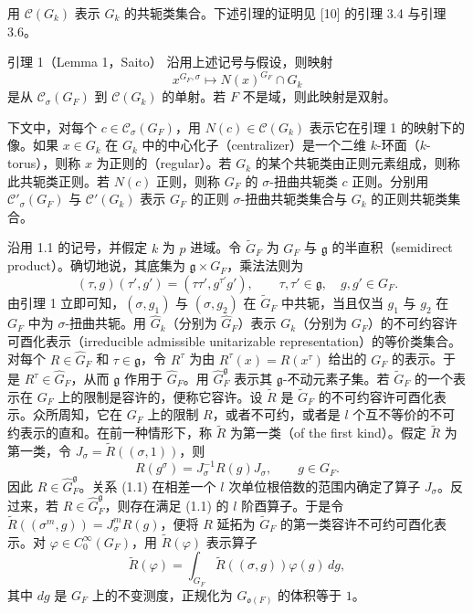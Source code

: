 用 $\mathcal C(G_k)$ 表示 $G_k$ 的共轭类集合。下述引理的证明见 [10] 的引理 3.4 与引理 3.6。

\begin{originaltheorem}{引理 1（Lemma 1，Saito）}
沿用上述记号与假设，则映射
\[
 x^{G_F,\sigma}\longmapsto N(x)^{G_F}\cap G_k
\]
是从 $\mathcal C_\sigma(G_F)$ 到 $\mathcal C(G_k)$ 的单射。若 $F$ 不是域，则此映射是双射。
\end{originaltheorem}

下文中，对每个 $c\in\mathcal C_\sigma(G_F)$，用 $N(c)\in\mathcal C(G_k)$ 表示它在引理 1 的映射下的像。如果 $x\in G_k$ 在 $G_k$ 中的中心化子（centralizer）是一个二维 $k$-环面（$k$-torus），则称 $x$ 为正则的（regular）。若 $G_k$ 的某个共轭类由正则元素组成，则称此共轭类正则。若 $N(c)$ 正则，则称 $G_F$ 的 $\sigma$-扭曲共轭类 $c$ 正则。分别用 $\mathcal C'_\sigma(G_F)$ 与 $\mathcal C'(G_k)$ 表示 $G_F$ 的正则 $\sigma$-扭曲共轭类集合与 $G_k$ 的正则共轭类集合。

沿用 1.1 的记号，并假定 $k$ 为 $p$ 进域。令 $\widetilde G_F$ 为 $G_F$ 与 $\mathfrak g$ 的半直积（semidirect product）。确切地说，其底集为 $\mathfrak g\times G_F$，乘法法则为
\[
 (\tau,g)(\tau',g')=(\tau\tau',g^{\tau'}g'),
 \qquad\tau,\tau'\in\mathfrak g,\quad g,g'\in G_F.
\]
由引理 1 立即可知，$(\sigma,g_1)$ 与 $(\sigma,g_2)$ 在 $\widetilde G_F$ 中共轭，当且仅当 $g_1$ 与 $g_2$ 在 $G_F$ 中为 $\sigma$-扭曲共轭。用 $\widehat G_k$（分别为 $\widehat G_F$）表示 $G_k$（分别为 $G_F$）的不可约容许可酉化表示（irreducible admissible unitarizable representation）的等价类集合。对每个 $R\in\widehat G_F$ 和 $\tau\in\mathfrak g$，令 $R^\tau$ 为由 $R^\tau(x)=R(x^\tau)$ 给出的 $G_F$ 的表示。于是 $R^\tau\in\widehat G_F$，从而 $\mathfrak g$ 作用于 $\widehat G_F$。用 $\widehat G_F^{\mathfrak g}$ 表示其 $\mathfrak g$-不动元素子集。若 $\widetilde G_F$ 的一个表示在 $G_F$ 上的限制是容许的，便称它容许。设 $\widetilde R$ 是 $\widetilde G_F$ 的不可约容许可酉化表示。众所周知，它在 $G_F$ 上的限制 $R$，或者不可约，或者是 $l$ 个互不等价的不可约表示的直和。在前一种情形下，称 $\widetilde R$ 为第一类（of the first kind）。假定 $\widetilde R$ 为第一类，令 $J_\sigma=\widetilde R((\sigma,1))$，则
\begin{equation}
 R(g^\sigma)=J_\sigma^{-1}R(g)J_\sigma,\qquad g\in G_F.
 \tag{1.1}
\end{equation}
因此 $R\in\widehat G_F^{\mathfrak g}$。关系 (1.1) 在相差一个 $l$ 次单位根倍数的范围内确定了算子 $J_\sigma$。反过来，若 $R\in\widehat G_F^{\mathfrak g}$，则存在满足 (1.1) 的 $l$ 阶酉算子。于是令 $\widetilde R((\sigma^m,g))=J_\sigma^mR(g)$，便将 $R$ 延拓为 $\widetilde G_F$ 的第一类容许不可约可酉化表示。对 $\varphi\in C_0^\infty(G_F)$，用 $\widetilde R(\varphi)$ 表示算子
\[
 \widetilde R(\varphi)=\int_{G_F}\widetilde R((\sigma,g))\varphi(g)\,dg,
\]
其中 $dg$ 是 $G_F$ 上的不变测度，正规化为 $G_{\mathfrak o(F)}$ 的体积等于 $1$。

